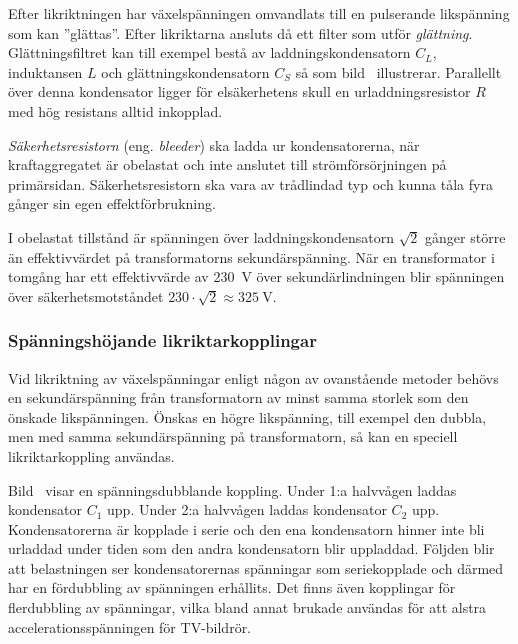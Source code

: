 
Efter likriktningen har växelspänningen omvandlats till en pulserande
likspänning som kan ''glättas''.
Efter likriktarna ansluts då ett filter som utför \emph{glättning}.
Glättningsfiltret kan till exempel bestå av laddningskondensatorn \(C_L\),
induktansen \(L\) och glättningskondensatorn \(C_S\) så som bild~
illustrerar.
Parallellt över denna kondensator ligger för elsäkerhetens skull en
urladdningsresistor \(R\) med hög resistans alltid inkopplad.

\emph{Säkerhetsresistorn} (eng. \emph{bleeder}) ska ladda ur kondensatorerna,
när kraftaggregatet är obelastat och inte anslutet till strömförsörjningen på
primärsidan.
Säkerhetsresistorn ska vara av trådlindad typ och kunna tåla fyra gånger sin
egen effektförbrukning.

I obelastat tillstånd är spänningen över laddningskondensatorn \(\sqrt{2}\)
gånger större än effektivvärdet på transformatorns sekundärspänning.
När en transformator i tomgång har ett effektivvärde av \qty{230}{\volt} över
sekundärlindningen blir spänningen över säkerhetsmotståndet
\(230\cdot\sqrt{2} \approx \qty{325}{\volt}\).

\subsubsection{Spänningshöjande likriktarkopplingar}

Vid likriktning av växelspänningar enligt någon av ovanstående metoder behövs
en sekundärspänning från transformatorn av minst samma storlek som den önskade
likspänningen.
Önskas en högre likspänning, till exempel den dubbla, men med samma
sekundärspänning på transformatorn, så kan en speciell likriktarkoppling
användas.

Bild~ visar en spänningsdubblande koppling.
Under 1:a halvvågen laddas kondensator \(C_1\) upp.
Under 2:a halvvågen laddas kondensator \(C_2\) upp.
Kondensatorerna är kopplade i serie och den ena kondensatorn hinner inte bli
urladdad under tiden som den andra kondensatorn blir uppladdad.
Följden blir att belastningen ser kondensatorernas spänningar som seriekopplade
och därmed har en fördubbling av spänningen erhållits.
Det finns även kopplingar för flerdubbling av spänningar, vilka bland annat
brukade användas för att alstra accelerationsspänningen för TV-bildrör.

